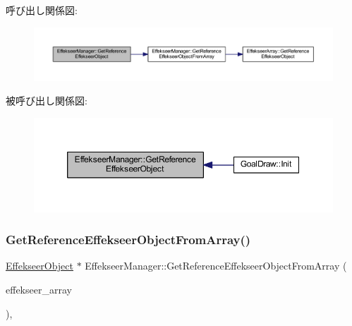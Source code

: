 呼び出し関係図\+:\nopagebreak
\begin{figure}[H]
\begin{center}
\leavevmode
\includegraphics[width=350pt]{class_effekseer_manager_a44878c9abb7f43521c7e8a9700668a28_cgraph}
\end{center}
\end{figure}
被呼び出し関係図\+:\nopagebreak
\begin{figure}[H]
\begin{center}
\leavevmode
\includegraphics[width=350pt]{class_effekseer_manager_a44878c9abb7f43521c7e8a9700668a28_icgraph}
\end{center}
\end{figure}
\mbox{\label{class_effekseer_manager_a1469d014a3d10dd38dc7d03db7f2ebfe}} 
\subsubsection{\texorpdfstring{Get\+Reference\+Effekseer\+Object\+From\+Array()}{GetReferenceEffekseerObjectFromArray()}}
{\footnotesize\ttfamily \mbox{\hyperlink{class_effekseer_object}{Effekseer\+Object}} $\ast$ Effekseer\+Manager\+::\+Get\+Reference\+Effekseer\+Object\+From\+Array (\begin{DoxyParamCaption}\item[{\mbox{\hyperlink{class_effekseer_array}{Effekseer\+Array}} $\ast$}]{effekseer\+\_\+array }\end{DoxyParamCaption})\hspace{0.3cm}{\ttfamily [static]}, {\ttfamily [private]}}



